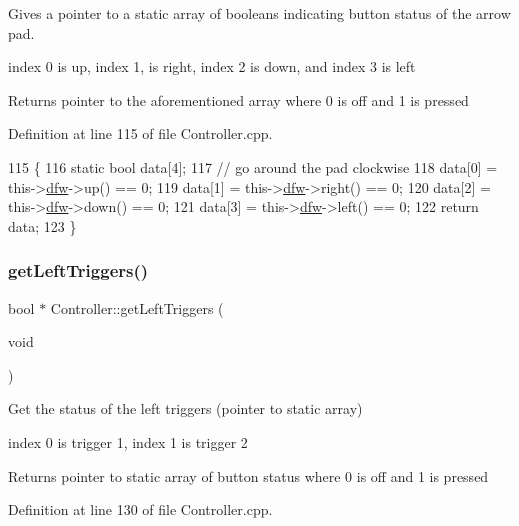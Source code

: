 Gives a pointer to a static array of booleans indicating button status of the arrow pad. 

index 0 is up, index 1, is right, index 2 is down, and index 3 is left \begin{DoxyReturn}{Returns}
pointer to the aforementioned array where 0 is off and 1 is pressed 
\end{DoxyReturn}


Definition at line 115 of file Controller.\+cpp.


\begin{DoxyCode}
115                               \{
116     \textcolor{keyword}{static} \textcolor{keywordtype}{bool} data[4];
117     \textcolor{comment}{// go around the pad clockwise}
118     data[0] = this->\hyperlink{class_controller_af4793ccbf2ecdbfcdb9359bd32b6e8cf}{dfw}->up() == 0;
119     data[1] = this->\hyperlink{class_controller_af4793ccbf2ecdbfcdb9359bd32b6e8cf}{dfw}->right() == 0;
120     data[2] = this->\hyperlink{class_controller_af4793ccbf2ecdbfcdb9359bd32b6e8cf}{dfw}->down() == 0;
121     data[3] = this->\hyperlink{class_controller_af4793ccbf2ecdbfcdb9359bd32b6e8cf}{dfw}->left() == 0;
122     \textcolor{keywordflow}{return} data;
123 \}
\end{DoxyCode}
\mbox{\label{class_controller_ab365e97c2d57559a84acda2794c46b01}} 
\subsubsection{\texorpdfstring{get\+Left\+Triggers()}{getLeftTriggers()}}
{\footnotesize\ttfamily bool $\ast$ Controller\+::get\+Left\+Triggers (\begin{DoxyParamCaption}\item[{void}]{ }\end{DoxyParamCaption})}



Get the status of the left triggers (pointer to static array) 

index 0 is trigger 1, index 1 is trigger 2 \begin{DoxyReturn}{Returns}
pointer to static array of button status where 0 is off and 1 is pressed 
\end{DoxyReturn}


Definition at line 130 of file Controller.\+cpp.


